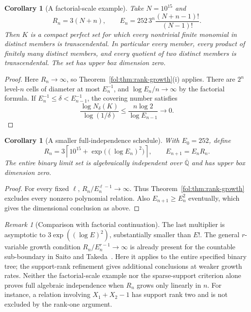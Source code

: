 \documentclass[11pt,a4paper]{article}
\newtheorem{corollary}[theorem]{Corollary}
\theoremstyle{definition}
\theoremstyle{remark}
\newtheorem{remark}[theorem]{Remark}
\numberwithin{equation}{section}
\begin{document}
\begin{corollary}[A factorial-scale example]
\label{fol:cor:factorial-scale}
Take $N=10^{15}$ and
\[
 R_n=3(N+n),\qquad E_n=252\,3^n\frac{(N+n-1)!}{(N-1)!}.
\]
Then $K$ is a compact perfect set for which every nontrivial finite
monomial in distinct members is transcendental. In particular every
member, every product of finitely many distinct members, and every
quotient of two distinct members is transcendental. The set has upper
box dimension zero.
\end{corollary}
\begin{proof}
Here $R_n\to\infty$, so Theorem~\ref{fol:thm:rank-growth}(i) applies. There
are $2^n$ level-$n$ cells of diameter at most $E_n^{-1}$, and
$\log E_n/n\to\infty$ by the factorial formula. If
$E_n^{-1}\le\delta<E_{n-1}^{-1}$, the covering number satisfies
\[
 \frac{\log N_\delta(K)}{\log(1/\delta)}
 \le\frac{n\log2}{\log E_{n-1}}\longrightarrow0.
\]
\end{proof}

\begin{corollary}[A smaller full-independence schedule]
\label{fol:cor:quasipolynomial-schedule}
With $E_0=252$, define
\[
 R_n=3\left\lceil 10^{15}+
                   \exp\bigl((\log E_n)^2\bigr)\right\rceil,
 \qquad E_{n+1}=E_nR_n.
\]
The entire binary limit set is algebraically independent over
$\overline{\mathbb Q}$ and has upper box dimension zero.
\end{corollary}
\begin{proof}
For every fixed $\ell$, $R_n/E_n^{\ell-1}\to\infty$. Thus
Theorem~\ref{fol:thm:rank-growth} excludes every nonzero polynomial relation.
Also $E_{n+1}\ge E_n^2$ eventually, which gives the dimensional
conclusion as above.
\end{proof}

\begin{remark}[Comparison with factorial continuation]
The last multiplier is asymptotic to $3\exp((\log E)^2)$, substantially
smaller than $E!$. The general $r$-variable growth condition
$R_n/E_n^{r-1}\to\infty$ is already present for the countable
sub-boundary in Saito and Takeda~\cite[Theorem~1.3]{SaitoTakeda2022}.
Here it applies to the entire specified binary tree; the support-rank
refinement gives additional conclusions at weaker growth rates.
Neither the factorial-scale example nor the sparse-support criterion
alone proves full algebraic independence when $R_n$ grows only linearly
in $n$. For instance, a relation involving $X_1+X_2-1$ has support rank
two and is not excluded by the rank-one argument.
\end{remark}
\end{document}
